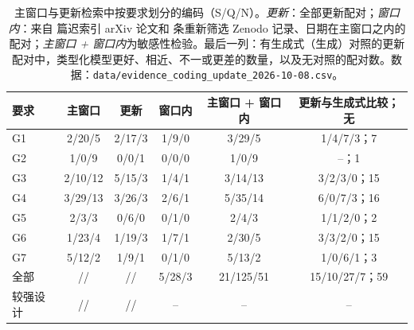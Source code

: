 \begin{table}[!htbp]
\centering
\footnotesize
\caption{主窗口与更新检索中按要求划分的编码（S/Q/N）。\emph{更新}：全部更新配对；\emph{窗口内}：来自 \nUSetLateIndexed{} 篇迟索引 arXiv 论文和 \nUSetReScreened{} 条重新筛选 Zenodo 记录、日期在主窗口之内的配对；\emph{主窗口 + 窗口内}为敏感性检验。最后一列：有生成式（生成）对照的更新配对中，类型化模型更好、相近、不一或更差的数量，以及无对照的配对数。数据：\nolinkurl{data/evidence_coding_update_2026-10-08.csv}。}
\label{tab:update}
\begin{tabular}{@{}lccccc@{}}
\toprule
要求 & 主窗口 & 更新 & 窗口内 & 主窗口 + 窗口内 & 更新与生成式比较；无 \\
\midrule
G1 & 2/20/5 & 2/17/3 & 1/9/0 & 3/29/5 & 1/4/7/3；7 \\
G2 & 1/0/9 & 0/0/1 & 0/0/0 & 1/0/9 & --；1 \\
G3 & 2/10/12 & 5/15/3 & 1/4/1 & 3/14/13 & 3/2/3/0；15 \\
G4 & 3/29/13 & 3/26/3 & 2/6/1 & 5/35/14 & 6/0/7/3；16 \\
G5 & 2/3/3 & 0/6/0 & 0/1/0 & 2/4/3 & 1/1/2/0；2 \\
G6 & 1/23/4 & 1/19/3 & 1/7/1 & 2/30/5 & 3/3/2/0；15 \\
G7 & 5/12/2 & 1/9/1 & 0/1/0 & 5/13/2 & 1/0/6/1；3 \\
\midrule
全部 & \nS{}/\nQ{}/\nN{} & \nUS{}/\nUQ{}/\nUN{} & 5/28/3 & 21/125/51 & 15/10/27/7；59 \\
较强设计 & \nStrongS{}/\nStrongQ{}/\nStrongN{} & \nUStrongS{}/\nUStrongQ{}/\nUStrongN{} & -- & -- & -- \\
\bottomrule
\end{tabular}
\end{table}


